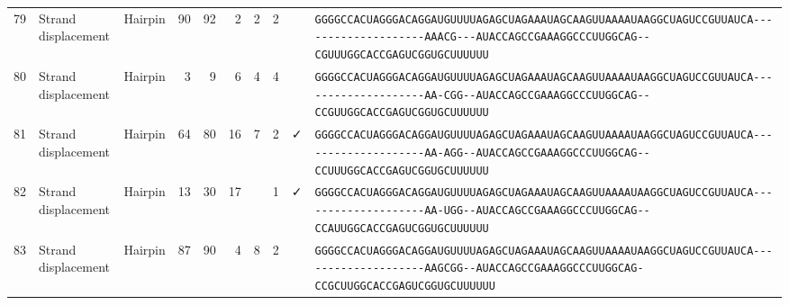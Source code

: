 \begin{tabular}{rllrrrrrcl}
 79 & Strand displacement & Hairpin & 90 & 92 & 2 & 2 & 2 &  &
 \color{ucsfdarkgrey}\verb|GGGGCCACUAGGGACAGGAU|\color{ucsforange}\verb|GUUUUA|\color{ucsfblue}\verb|GAGCUAGAAAUAGCAAGU|\color{ucsforange}\verb|UAAAAUAA|\color{ucsfnavy}\verb|GGCUAGUCCGU|\color{ucsforange}\verb|UAUCA|\color{ucsfteal}\verb|--------------------AAACG---|\color{ucsfpurple}\verb|AUACCAGCCGAAAGGCCCUUGGCAG|\color{ucsfteal}\verb|--CGUUUG|\color{ucsforange}\verb|GCACCGAGUCGGUGCUUUUUU| \\

 80 & Strand displacement & Hairpin & 3 & 9 & 6 & 4 & 4 &  &
 \color{ucsfdarkgrey}\verb|GGGGCCACUAGGGACAGGAU|\color{ucsforange}\verb|GUUUUA|\color{ucsfblue}\verb|GAGCUAGAAAUAGCAAGU|\color{ucsforange}\verb|UAAAAUAA|\color{ucsfnavy}\verb|GGCUAGUCCGU|\color{ucsforange}\verb|UAUCA|\color{ucsfteal}\verb|--------------------AA-CGG--|\color{ucsfpurple}\verb|AUACCAGCCGAAAGGCCCUUGGCAG|\color{ucsfteal}\verb|--CCGUUG|\color{ucsforange}\verb|GCACCGAGUCGGUGCUUUUUU| \\

 81 & Strand displacement & Hairpin & 64 & 80 & 16 & 7 & 2 & ✓ &
 \color{ucsfdarkgrey}\verb|GGGGCCACUAGGGACAGGAU|\color{ucsforange}\verb|GUUUUA|\color{ucsfblue}\verb|GAGCUAGAAAUAGCAAGU|\color{ucsforange}\verb|UAAAAUAA|\color{ucsfnavy}\verb|GGCUAGUCCGU|\color{ucsforange}\verb|UAUCA|\color{ucsfteal}\verb|--------------------AA-AGG--|\color{ucsfpurple}\verb|AUACCAGCCGAAAGGCCCUUGGCAG|\color{ucsfteal}\verb|--CCUUUG|\color{ucsforange}\verb|GCACCGAGUCGGUGCUUUUUU| \\

 82 & Strand displacement & Hairpin & 13 & 30 & 17 &  & 1 & ✓ &
 \color{ucsfdarkgrey}\verb|GGGGCCACUAGGGACAGGAU|\color{ucsforange}\verb|GUUUUA|\color{ucsfblue}\verb|GAGCUAGAAAUAGCAAGU|\color{ucsforange}\verb|UAAAAUAA|\color{ucsfnavy}\verb|GGCUAGUCCGU|\color{ucsforange}\verb|UAUCA|\color{ucsfteal}\verb|--------------------AA-UGG--|\color{ucsfpurple}\verb|AUACCAGCCGAAAGGCCCUUGGCAG|\color{ucsfteal}\verb|--CCAUUG|\color{ucsforange}\verb|GCACCGAGUCGGUGCUUUUUU| \\

 83 & Strand displacement & Hairpin & 87 & 90 & 4 & 8 & 2 &  &
 \color{ucsfdarkgrey}\verb|GGGGCCACUAGGGACAGGAU|\color{ucsforange}\verb|GUUUUA|\color{ucsfblue}\verb|GAGCUAGAAAUAGCAAGU|\color{ucsforange}\verb|UAAAAUAA|\color{ucsfnavy}\verb|GGCUAGUCCGU|\color{ucsforange}\verb|UAUCA|\color{ucsfteal}\verb|--------------------AAGCGG--|\color{ucsfpurple}\verb|AUACCAGCCGAAAGGCCCUUGGCAG|\color{ucsfteal}\verb|-CCGCUUG|\color{ucsforange}\verb|GCACCGAGUCGGUGCUUUUUU| \\


\end{tabular}
